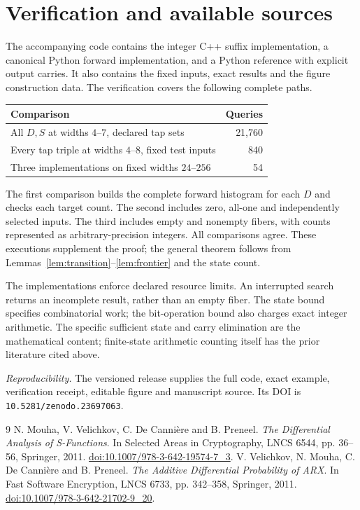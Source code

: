\documentclass[11pt,a4paper]{article}
\theoremstyle{definition}\newtheorem{definition}[theorem]{Definition}
\begin{document}
\section{Verification and available sources}
The accompanying code contains the integer C++ suffix implementation, a canonical
Python forward implementation, and a Python reference with explicit output carries.
It also contains the fixed inputs, exact results and the figure construction data.
The verification covers the following complete paths.
\begin{center}
\begin{tabular}{lr}
\toprule
Comparison & Queries\\
\midrule
All $D,S$ at widths $4$--$7$, declared tap sets & 21,760\\
Every tap triple at widths $4$--$8$, fixed test inputs & 840\\
Three implementations on fixed widths $24$--$256$ & 54\\
\bottomrule
\end{tabular}
\end{center}
The first comparison builds the complete forward histogram for each $D$ and
checks each target count. The second includes zero, all-one and independently
selected inputs. The third includes empty and nonempty fibers, with counts
represented as arbitrary-precision integers. All comparisons agree.
These executions supplement the proof; the general theorem follows from
Lemmas~\ref{lem:transition}--\ref{lem:frontier} and the state count.

The implementations enforce declared resource limits. An interrupted search
returns an incomplete result, rather than an empty fiber.
The state bound specifies combinatorial work; the bit-operation bound also charges exact integer arithmetic.
The specific sufficient state and carry elimination are the mathematical content;
finite-state arithmetic counting itself has the prior literature cited above.

\noindent\textit{Reproducibility.}
The versioned release supplies the full code, exact example, verification receipt,
editable figure and manuscript source. Its DOI is \texttt{10.5281/zenodo.23697063}.

\begin{thebibliography}{9}
N. Mouha, V. Velichkov, C. De Canni\`ere and B. Preneel.
\emph{The Differential Analysis of S-Functions}.
In Selected Areas in Cryptography, LNCS 6544, pp. 36--56, Springer, 2011.
\href{https://doi.org/10.1007/978-3-642-19574-7_3}{doi:10.1007/978-3-642-19574-7\_3}.
V. Velichkov, N. Mouha, C. De Canni\`ere and B. Preneel.
\emph{The Additive Differential Probability of ARX}.
In Fast Software Encryption, LNCS 6733, pp. 342--358, Springer, 2011.
\href{https://doi.org/10.1007/978-3-642-21702-9_20}{doi:10.1007/978-3-642-21702-9\_20}.
\end{thebibliography}
\end{document}

